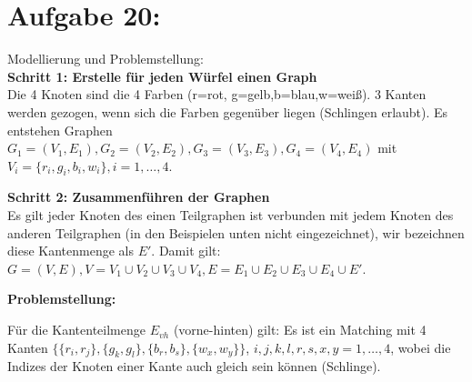 \documentclass[11pt]{scrartcl} %
\newcommand{\addEdge}[1]{
    \foreach \start/\end/\style in {#1}
        \draw [\style] (\start) to (\end);
}
\begin{document}
\section*{Aufgabe 20:}
\begin{compactenum}[(a)]
\item Modellierung und Problemstellung:\\

\textbf{Schritt 1: Erstelle für jeden Würfel einen Graph}\\
Die 4 Knoten sind die 4 Farben (r=rot, g=gelb,b=blau,w=weiß). 3 Kanten werden gezogen, wenn sich die Farben gegenüber liegen (Schlingen erlaubt). Es entstehen Graphen $G_1=(V_1,E_1),G_2=(V_2,E_2),G_3=(V_3,E_3),G_4=(V_4,E_4)$ mit $V_i=\lbrace r_i,g_i,b_i,w_i \rbrace, i=1,\dots, 4$.
\newline

\textbf{Schritt 2: Zusammenführen der Graphen}  \\
Es gilt jeder Knoten des einen Teilgraphen ist verbunden mit jedem Knoten des anderen Teilgraphen (in den Beispielen unten nicht eingezeichnet), wir bezeichnen diese Kantenmenge als $E'$. Damit gilt: $G=(V,E), V=V_1 \cup V_2\cup V_3\cup V_4, E=E_1 \cup E_2 \cup E_3 \cup E_4 \cup E'$.

\newpage
\textbf{Problemstellung:} 

\begin{minipage}[h]{0.3\textwidth}
\end{minipage}
\begin{minipage}[h]{0.70\textwidth}
    Für die Kantenteilmenge $E_{vh}$ (vorne-hinten) gilt: Es ist ein Matching mit 4 Kanten $\lbrace \lbrace r_i,r_j \rbrace,\lbrace g_k,g_l\rbrace,\lbrace b_r,b_s \rbrace ,\lbrace w_x,w_y\rbrace \rbrace$, $i,j,k,l,r,s,x,y =1,\dots,4$, wobei die Indizes der Knoten einer Kante auch gleich sein können (Schlinge).
\end{minipage}
\newline


\end{compactenum}
\end{document}
